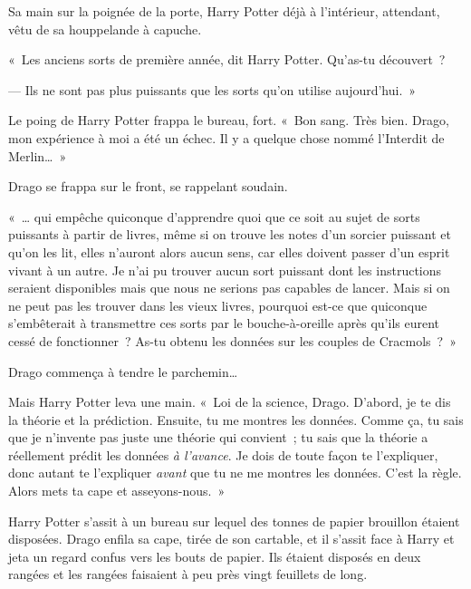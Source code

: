 Sa main sur la poignée de la porte, Harry Potter déjà à l'intérieur, attendant, vêtu de sa houppelande à capuche.

«~Les anciens sorts de première année, dit Harry Potter.
Qu'as-tu découvert~?

--- Ils ne sont pas plus puissants que les sorts qu'on utilise aujourd'hui.~»

Le poing de Harry Potter frappa le bureau, fort.
«~Bon sang.
Très bien.
Drago, mon expérience à moi a été un échec.
Il y a quelque chose nommé l'Interdit de Merlin…~»

Drago se frappa sur le front, se rappelant soudain.

«~… qui empêche quiconque d'apprendre quoi que ce soit au sujet de sorts puissants à partir de livres, même si on trouve les notes d'un sorcier puissant et qu'on les lit, elles n'auront alors aucun sens, car elles doivent passer d'un esprit vivant à un autre.
Je n'ai pu trouver aucun sort puissant dont les instructions seraient disponibles mais que nous ne serions pas capables de lancer.
Mais si on ne peut pas les trouver dans les vieux livres, pourquoi est-ce que quiconque s'embêterait à transmettre ces sorts par le bouche-à-oreille après qu'ils eurent cessé de fonctionner~?
As-tu obtenu les données sur les couples de Cracmols~?~»

Drago commença à tendre le parchemin…

Mais Harry Potter leva une main.
«~Loi de la science, Drago.
D'abord, je te dis la théorie et la prédiction.
Ensuite, tu me montres les données.
Comme ça, tu sais que je n'invente pas juste une théorie qui convient~; tu sais que la théorie a réellement prédit les données \emph{à l'avance}.
Je dois de toute façon te l'expliquer, donc autant te l'expliquer \emph{avant} que tu ne me montres les données.
C'est la règle.
Alors mets ta cape et asseyons-nous.~»

Harry Potter s'assit à un bureau sur lequel des tonnes de papier brouillon étaient disposées.
Drago enfila sa cape, tirée de son cartable, et il s'assit face à Harry et jeta un regard confus vers les bouts de papier.
Ils étaient disposés en deux rangées et les rangées faisaient à peu près vingt feuillets de long.

